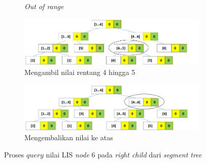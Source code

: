 \begin{figure}[H]
\begin{subfigure}{1.0\textwidth}
		\caption{\textit{Out of range}}
		\label{fig:subproses8}
	\end{subfigure}
	\begin{subfigure}{1.0\textwidth}
		\centering
		\includegraphics[scale=0.32]{assets/images/Ilustrasi_proses_9.PNG}
		\caption{Mengambil nilai rentang 4 hingga 5}
		\label{fig:subproses9}
	\end{subfigure}
	\begin{subfigure}{1.0\textwidth}
		\centering
		\includegraphics[scale=0.32]{assets/images/Ilustrasi_proses_10.PNG}
		\caption{Mengembalikan nilai ke atas}
		\label{fig:subproses10}
	\end{subfigure}
	\caption{Proses \textit{$query$} nilai LIS \textit{node} 6 pada \textit{right child} dari \textit{segment tree}}
	\label{fig:proses2}
\end{figure}
